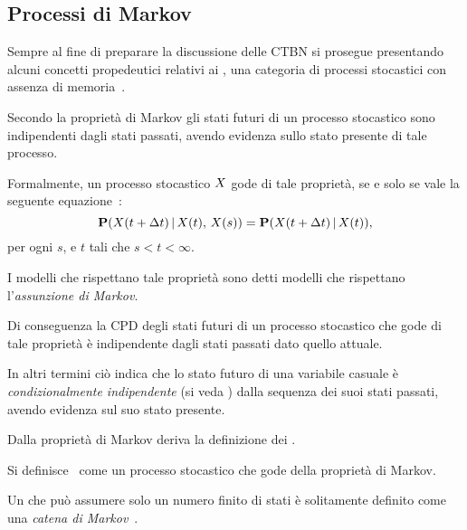 \subsection{Processi di Markov}
\label{sec:mps}

Sempre al fine di preparare la discussione delle \acl{CTBN} si prosegue presentando alcuni concetti propedeutici relativi ai \mprocess{}, una categoria di processi stocastici con assenza di memoria~\citep{Loeve1978}.

\begin{definizione}
\label{defn:markov-assumption}
Secondo la proprietà di Markov gli stati futuri di un processo stocastico sono indipendenti dagli stati passati, avendo evidenza sullo stato presente di tale processo.

Formalmente, un processo stocastico $\mathnormal{X}$ gode di tale proprietà, se e solo se vale la seguente equazione~\citep{Loeve1978}:
\begin{equation}
\label{eq:markov-assumption}
\mathbf{P}(\mathnormal{X}(t + \Delta t)\,\arrowvert\,\mathnormal{X}(t),\,\mathnormal{X}(s))=\mathbf{P}(\mathnormal{X}(t + \Delta t)\,\arrowvert\,\mathnormal{X}(t))\text{,}
\end{equation}
per ogni $s$, e $t$ tali che $s < t < \infty$.

I modelli che rispettano tale proprietà sono detti modelli che rispettano l'\emph{assunzione di Markov}.
\end{definizione}

Di conseguenza la \acl{CPD} degli stati futuri di un processo stocastico che gode di tale proprietà è indipendente dagli stati passati dato quello attuale.

In altri termini ciò indica che lo stato futuro di una variabile casuale è \emph{condizionalmente indipendente} (si veda ) dalla sequenza dei suoi stati passati, avendo evidenza sul suo stato presente.

Dalla proprietà di Markov deriva la definizione dei \mprocess{}.

\begin{definizione}[\upcase\mprocess*{}]
Si definisce~\citep{Loeve1978} come \mprocess*{} un processo stocastico che gode della proprietà di Markov.
\end{definizione}

\begin{definizione}
Un \mprocess*{} che può assumere solo un numero finito di stati è solitamente definito come una \emph{catena di Markov}~\citep[si veda][10]{Norris1998}.
\end{definizione}

